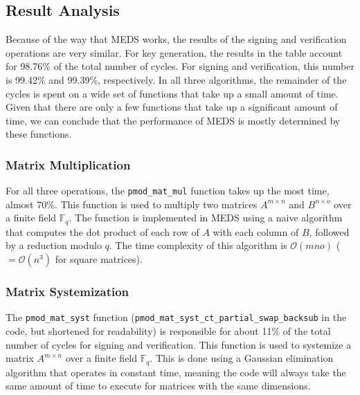 \documentclass[11pt,a4paper]{report}
\theoremstyle{definition}
\begin{document}
\subsection{Result Analysis}
Because of the way that MEDS works, the results of the signing and verification operations are very similar. For key generation, the results in the table account for 98.76\% of the total number of cycles. For signing and verification, this number is 99.42\% and 99.39\%, respectively. In all three algorithms, the remainder of the cycles is spent on a wide set of functions that take up a small amount of time. Given that there are only a few functions that take up a significant amount of time, we can conclude that the performance of MEDS is mostly determined by these functions.

\subsubsection{Matrix Multiplication}
For all three operations, the \texttt{pmod\_mat\_mul} function takes up the most time, almost 70\%. This function is used to multiply two matrices $A^{m \times n}$ and $B^{n \times o}$ over a finite field $\mathbb{F}_q$. The function is implemented in MEDS using a naive algorithm that computes the dot product of each row of $A$ with each column of $B$, followed by a reduction modulo $q$. The time complexity of this algorithm is $\mathcal{O}(mno)$ ($= \mathcal{O}(n^3)$ for square matrices).

\subsubsection{Matrix Systemization}
The \texttt{pmod\_mat\_syst} function (\texttt{pmod\_mat\_syst\_ct\_partial\_swap\_backsub} in the code, but shortened for readability) is responsible for about 11\% of the total number of cycles for signing and verification. This function is used to systemize a matrix $A^{m \times n}$ over a finite field $\mathbb{F}_q$. This is done using a Gaussian elimination algorithm that operates in constant time, meaning the code will always take the same amount of time to execute for matrices with the same dimensions.
\end{document}
